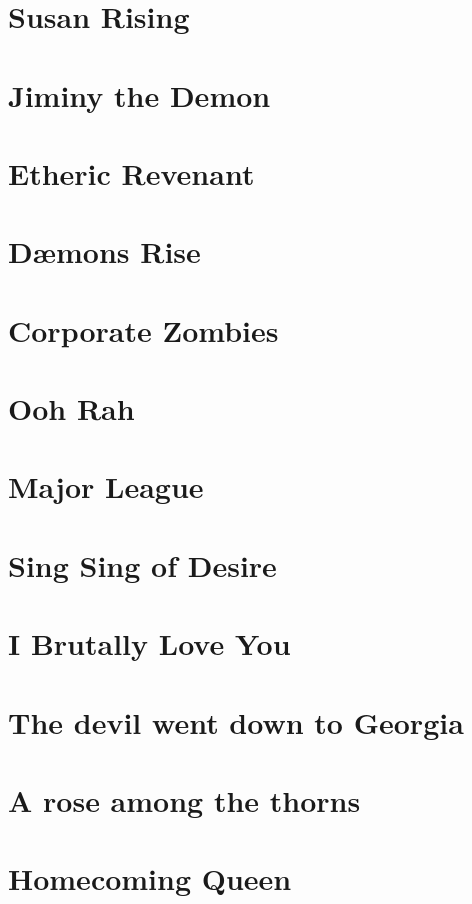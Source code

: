 \documentclass[12pt,twoside,onecolumn,openright,extrafontsizes]{memoir}
\begin{document}
\clearpage
\tableofcontents*

\mainmatter
\chapter{Susan Rising}

\chapter{Jiminy the Demon}

\chapter{Etheric Revenant}

\chapter{D\ae mons Rise}

\chapter{Corporate Zombies}

\chapter{Ooh Rah}

\chapter{Major League}

\chapter{Sing Sing of Desire}

\chapter{I Brutally Love You}

\chapter{The devil went down to Georgia}

\chapter{A rose among the thorns}

\chapter{Homecoming Queen}

\end{document}

